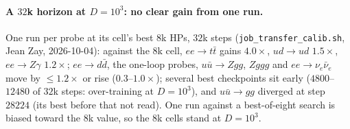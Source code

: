 \documentclass[11pt]{article}
\newcommand{\code}[1]{\texttt{#1}}
\begin{document}
\paragraph{A $32$k horizon at $D=10^3$: no clear gain from one run.} One run per probe at its cell's best $8$k HPs, $32$k
steps (\code{job\_transfer\_calib.sh}, Jean Zay, 2026-10-04): against the $8$k cell, $ee\to t\bar t$ gains $4.0\times$,
$ud\to ud$ $1.5\times$, $ee\to Z\gamma$ $1.2\times$; $ee\to d\bar d$, the one-loop probes, $u\bar u\to Zgg$, $Zggg$ and
$ee\to\nu_e\bar\nu_e$ move by $\le1.2\times$ or rise ($0.3$--$1.0\times$); several best checkpoints sit early
($4800$--$12480$ of $32$k steps: over-training at $D=10^3$), and $u\bar u\to gg$ diverged at step $28224$ (its best before
that not read). One run against a best-of-eight search is biased toward the $8$k value, so the $8$k cells stand at
$D=10^3$.
\end{document}
